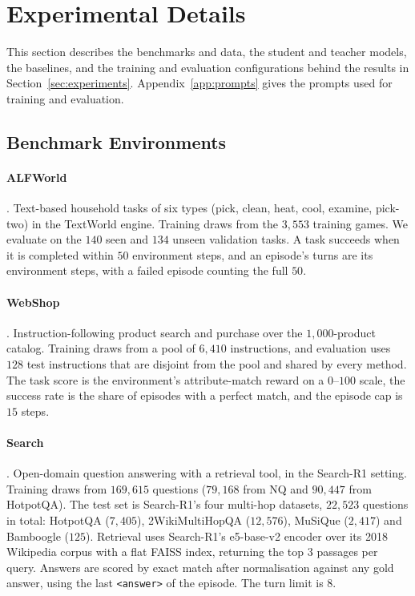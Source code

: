 \section{Experimental Details}
\label{app:provenance}

This section describes the benchmarks and data, the student and teacher models, the baselines, and
the training and evaluation configurations behind the results in Section~\ref{sec:experiments}.
Appendix~\ref{app:prompts} gives the prompts used for training and evaluation.

\subsection{Benchmark Environments}
\label{app:data}

\paragraph{ALFWorld} \citep{shridhar2021alfworld}. Text-based household tasks of six types (pick,
clean, heat, cool, examine, pick-two) in the TextWorld engine. Training draws from the $3{,}553$
training games. We evaluate on the $140$ seen and $134$ unseen validation tasks. A task succeeds when
it is completed within $50$ environment steps, and an episode's turns are its environment steps, with
a failed episode counting the full $50$.

\paragraph{WebShop} \citep{yao2022webshop}. Instruction-following product search and purchase over the
$1{,}000$-product catalog. Training draws from a pool of $6{,}410$ instructions, and evaluation uses
$128$ test instructions that are disjoint from the pool and shared by every method. The task score is
the environment's attribute-match reward on a $0$--$100$ scale, the success rate is the share of
episodes with a perfect match, and the episode cap is $15$ steps.

\paragraph{Search} \citep{jin2025searchr1}. Open-domain question answering with a retrieval tool, in
the Search-R1 setting. Training draws from $169{,}615$ questions ($79{,}168$ from NQ and $90{,}447$
from HotpotQA). The test set is Search-R1's four multi-hop datasets, $22{,}523$ questions in total:
HotpotQA ($7{,}405$), 2WikiMultiHopQA ($12{,}576$), MuSiQue ($2{,}417$) and Bamboogle ($125$). Retrieval uses Search-R1's e5-base-v2 encoder over its 2018 Wikipedia
corpus with a flat FAISS index, returning the top $3$ passages per query. Answers are scored by exact
match after normalisation against any gold answer, using the last \texttt{<answer>} of the episode.
The turn limit is $8$.

